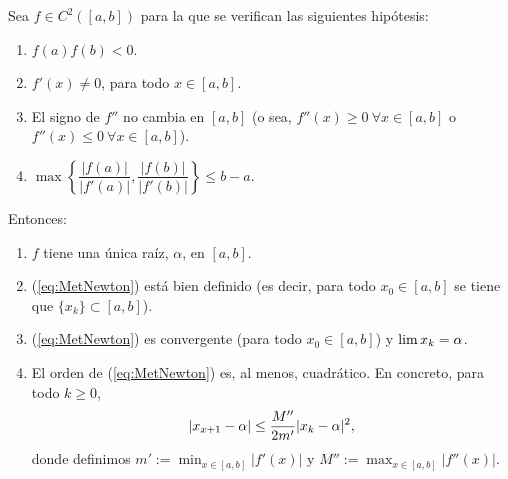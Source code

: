\begin{theorem}
  Sea $f\in C^2([a,b])$ para la que se verifican las siguientes
  hipótesis:
  \begin{enumerate}[label=($N_{\arabic*}$)]
  \item $f(a)f(b)<0$.
    \label{item:Newton.H1}
  \item  $f'(x)\neq 0$, para todo $x \in [a,b]$.
    \label{item:Newton.H2}    
  \item 
    El signo de $f''$ no cambia en $[a,b]$ (o sea,
      $f''(x)\ge 0 \ \forall x\in [a,b]$ o $f''(x)\le 0 \ \forall x\in [a,b]$).
    \label{item:Newton.H3}
  \item
    $\max\left\{ \dfrac{|f(a)|}{|f'(a)|}, \dfrac{|f(b)|}{|f'(b)|}
    \right\} \le b-a.$
    \label{item:Newton:H4}
  \end{enumerate}
  Entonces:
  \begin{enumerate}
  \item $f$ tiene una única raíz, $\alpha$, en $[a,b]$.
  \item (\ref{eq:MetNewton}) está bien definido (es decir, para todo
    $x_0\in [a,b]$ se tiene que $\{x_k\} \subset [a,b]$).
  \item (\ref{eq:MetNewton}) es convergente (para todo $x_0\in [a,b]$)
    y $\lim x_k = \alpha$.
  \item El orden de (\ref{eq:MetNewton}) es, al menos, cuadrático. En
    concreto, para todo $k\ge 0$,
    \begin{equation}
      |x_{x+1} - \alpha| \le \frac {M''}{2m'} |x_k-\alpha|^2, 
      \label{eq:Newton.orden.2}    
    \end{equation}
    donde definimos $m':=\min_{x\in[a,b]} |f'(x)|$ y $M'':=\max_{x\in[a,b]}|f''(x)|$.
  \end{enumerate}
  \label{thm:Newton.convergencia.global}  
\end{theorem}


